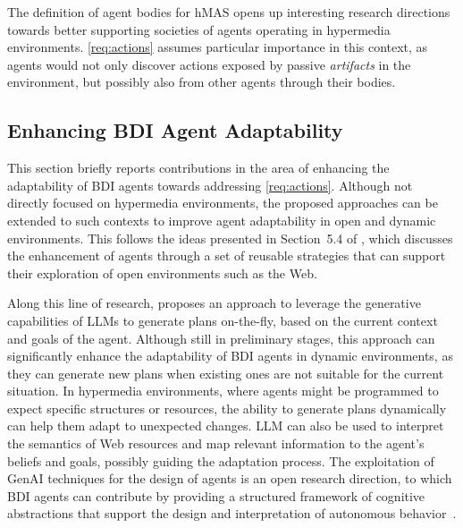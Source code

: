The definition of agent bodies for \ac{hMAS} opens up interesting research directions towards better supporting societies of agents operating in hypermedia environments. 
%
\ref{req:actions} assumes particular importance in this context, as agents would not only discover actions exposed by passive \emph{artifacts} in the environment, but possibly also from other agents through their bodies. 

\subsection{Enhancing BDI Agent Adaptability}

This section briefly reports contributions in the area of enhancing the adaptability of \ac{BDI} agents towards addressing \ref{req:actions}.
%
Although not directly focused on hypermedia environments, the proposed approaches can be extended to such contexts to improve agent adaptability in open and dynamic environments.
This follows the ideas presented in Section~5.4 of \cite{Boissier_Ciortea_Harth_Ricci_Vachtsevanou_2023}, which discusses the enhancement of agents through a set of reusable strategies that can support their exploration of open environments such as the Web.

Along this line of research,
\cite{Ciatto_Aguzzi_Battistini_Baiardi_Burattini_Ricci_2025} proposes an approach to leverage the generative capabilities of \acp{LLM} to generate plans on-the-fly, based on the current context and goals of the agent.
%
Although still in preliminary stages, this approach can significantly enhance the adaptability of \ac{BDI} agents in dynamic environments, as they can generate new plans when existing ones are not suitable for the current situation.
%
In hypermedia environments, where agents might be programmed to expect specific structures or resources, the ability to generate plans dynamically can help them adapt to unexpected changes.
%
\ac{LLM} can also be used to interpret the semantics of Web resources and map relevant information to the agent's beliefs and goals, possibly guiding the adaptation process.
%
The exploitation of \ac{GenAI} techniques for the design of agents is an open research direction, to which \ac{BDI} agents can contribute by providing a structured framework of cognitive abstractions that support the design and interpretation of autonomous behavior~\cite{DBLP:conf/atal/Ricci0ZBC24}.


